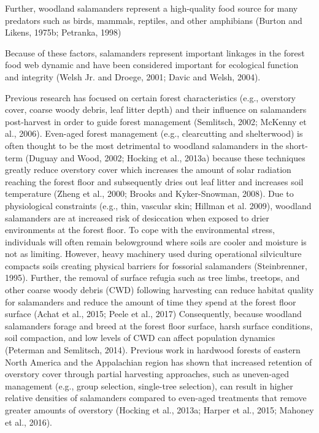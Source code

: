 Further, woodland salamanders represent a high-quality food source for many predators such as birds, mammals, reptiles, and other amphibians (Burton and Likens, 1975b; Petranka, 1998)

Because of these factors, salamanders represent important linkages in the forest food web dynamic and have been considered important for ecological function and integrity (Welsh Jr. and Droege, 2001; Davic and Welsh, 2004).

Previous research has focused on certain forest characteristics (e.g., overstory cover, coarse woody debris, leaf litter depth) and their influence on salamanders post-harvest in order to guide forest management (Semlitsch, 2002; McKenny et al., 2006).
Even-aged forest management (e.g., clearcutting and shelterwood) is often thought to be the most detrimental to woodland salamanders in the short-term (Duguay and Wood, 2002; Hocking et al., 2013a) 
because these techniques greatly reduce overstory cover which increases the amount of solar radiation reaching the forest floor and subsequently dries out leaf litter and increases soil temperature (Zheng et al., 2000; Brooks and Kyker-Snowman, 2008).
Due to physiological constraints (e.g., thin, vascular skin; Hillman et al. 2009), woodland salamanders are at increased risk of desiccation when exposed to drier environments at the forest floor.
To cope with the environmental stress, individuals will often remain belowground where soils are cooler and moisture is not as limiting. 
However, heavy machinery used during operational silviculture compacts soils creating physical barriers for fossorial salamanders (Steinbrenner, 1995).
Further, the removal of surface refugia such as tree limbs, treetops, and other coarse woody debris (CWD) following harvesting can reduce habitat quality for salamanders and reduce the amount of time they spend at the forest floor surface (Achat et al., 2015; Peele et al., 2017)
Consequently, because woodland salamanders forage and breed at the forest floor surface, harsh surface conditions, soil compaction, and low levels of CWD can affect population dynamics (Peterman and Semlitsch, 2014).
Previous work in hardwood forests of eastern North America and the Appalachian region has shown that increased retention of overstory cover through partial harvesting approaches, such as uneven-aged management (e.g., group selection, single-tree selection), 
can result in higher relative densities of salamanders compared to even-aged treatments that remove greater amounts of overstory (Hocking et al., 2013a; Harper et al., 2015; Mahoney et al., 2016).
